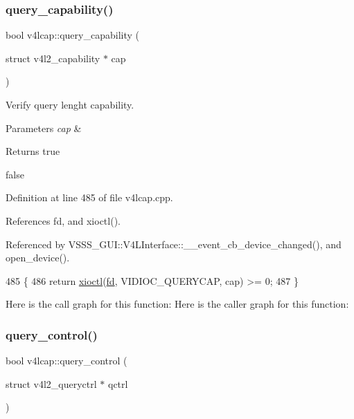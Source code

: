 \subsubsection{\texorpdfstring{query\+\_\+capability()}{query\_capability()}}
{\footnotesize\ttfamily bool v4lcap\+::query\+\_\+capability (\begin{DoxyParamCaption}\item[{struct v4l2\+\_\+capability $\ast$}]{cap }\end{DoxyParamCaption})}



Verify query lenght capability. 


\begin{DoxyParams}{Parameters}
{\em cap} & \\
\hline
\end{DoxyParams}
\begin{DoxyReturn}{Returns}
true 

false 
\end{DoxyReturn}


Definition at line 485 of file v4lcap.\+cpp.



References fd, and xioctl().



Referenced by V\+S\+S\+S\+\_\+\+G\+U\+I\+::\+V4\+L\+Interface\+::\+\_\+\+\_\+event\+\_\+cb\+\_\+device\+\_\+changed(), and open\+\_\+device().


\begin{DoxyCode}
485                                                           \{
486     \textcolor{keywordflow}{return} \hyperlink{classv4lcap_ab5aaa5a8c0df17f5ca57e0b5170232cb}{xioctl}(\hyperlink{classv4lcap_a38109593bde997dad13b3a461569573d}{fd}, VIDIOC\_QUERYCAP, cap) >= 0;
487 \}
\end{DoxyCode}
Here is the call graph for this function\+:
Here is the caller graph for this function\+:
\mbox{\label{classv4lcap_acede842207240d9eb3b4a8d99ff32fc4}} 
\subsubsection{\texorpdfstring{query\+\_\+control()}{query\_control()}}
{\footnotesize\ttfamily bool v4lcap\+::query\+\_\+control (\begin{DoxyParamCaption}\item[{struct v4l2\+\_\+queryctrl $\ast$}]{qctrl }\end{DoxyParamCaption})}



